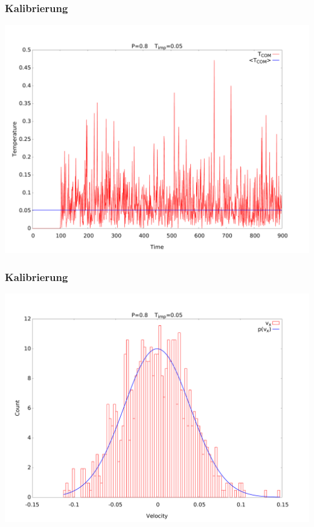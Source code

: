 \documentclass{beamer}
\begin{document}
\begin{frame}
\frametitle{Kalibrierung}
\begin{center}
\includegraphics[scale=0.2]{../images/vcomsqd.pdf}
\end{center}
\end{frame}

\begin{frame}
\frametitle{Kalibrierung}
\begin{center}
\includegraphics[scale=0.2]{../images/vcomtemp.pdf}
\end{center}
\end{frame}
\end{document}
